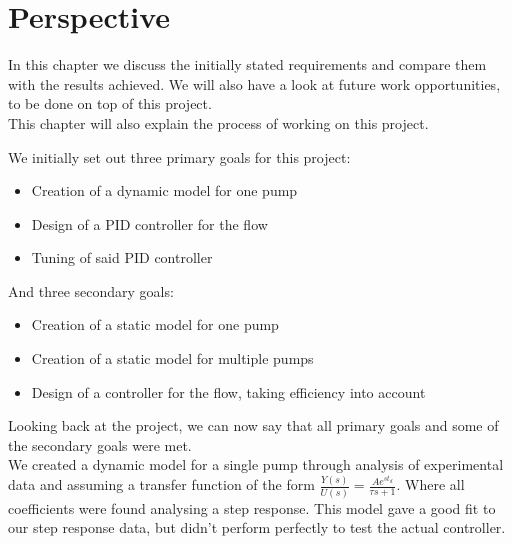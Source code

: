 \chapter{Perspective}\label{ch:perspective}
In this chapter we discuss the initially stated requirements
and compare them with the results achieved.
We will also have a look at future work opportunities,
to be done on top of this project.\\
This chapter will also explain the process of working on this project.

We initially set out three primary goals for this project:

\begin{itemize}
\item Creation of a dynamic model for one pump
\item Design of a PID controller for the flow
\item Tuning of said PID controller 
\end{itemize}
And three secondary goals:

\begin{itemize}
\item Creation of a static model for one pump
\item Creation of a static model for multiple pumps
\item Design of a controller for the flow, taking efficiency into account
\end{itemize}
Looking back at the project,
we can now say that all primary goals
and some of the secondary goals were met.
\\
We created a dynamic model for a single pump
through analysis of experimental data
and assuming a transfer function of the form 
$\frac{Y(s)}{U(s)}=\frac{A e^{s t_d}}{\tau s + 1}$.
Where all coefficients were found analysing a step response.
This model gave a good fit to our step response data,
but didn't perform perfectly to test the actual controller.

